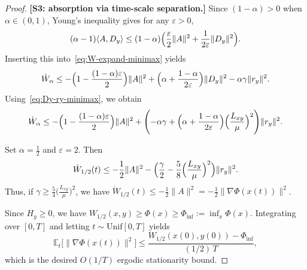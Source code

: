 \documentclass{article}
\newtheorem{proposition}[theorem]{Proposition}
\newcommand{\1}{\mathbf{1}}
\begin{document}
\begin{proof}
\textbf{[S3: absorption via time-scale separation.]}
Since $(1-\alpha)>0$ when $\alpha\in(0,1)$, Young's inequality gives for any $\varepsilon>0$,
\[
(\alpha-1)\langle A,D_y\rangle
\le
(1-\alpha)\Bigl(\frac{\varepsilon}{2}\|A\|^2+\frac{1}{2\varepsilon}\|D_y\|^2\Bigr).
\]
Inserting this into~\eqref{eq:W-expand-minimax} yields
\begin{equation}\label{eq:W-star-minimax}
\dot W_\alpha
\le
-\Bigl(1-\frac{(1-\alpha)\varepsilon}{2}\Bigr)\|A\|^2
+\Bigl(\alpha+\frac{1-\alpha}{2\varepsilon}\Bigr)\|D_y\|^2
-\alpha\gamma\|r_y\|^2.
\end{equation}
Using~\eqref{eq:Dy-ry-minimax}, we obtain
\[
\dot W_\alpha
\le
-\Bigl(1-\frac{(1-\alpha)\varepsilon}{2}\Bigr)\|A\|^2
+\Biggl(-\alpha\gamma+\Bigl(\alpha+\frac{1-\alpha}{2\varepsilon}\Bigr)\Bigl(\frac{L_{xy}}{\mu}\Bigr)^2\Biggr)\|r_y\|^2.
\]

Set $\alpha=\tfrac12$ and $\varepsilon=2$. Then
\[
\dot W_{1/2}(t)
\le
-\frac12\|A\|^2
-\Bigl(\frac{\gamma}{2}-\frac{5}{8}\Bigl(\frac{L_{xy}}{\mu}\Bigr)^2\Bigr)\|r_y\|^2.
\]
Thus, if $\gamma\ge \frac{5}{4}\bigl(\frac{L_{xy}}{\mu}\bigr)^2$, we have $\dot W_{1/2}(t)\le -\frac12\|A\|^2
= -\frac12\|\nabla\Phi(x(t))\|^2$.

Since $H_y\ge 0$, we have $W_{1/2}(x,y)\ge \Phi(x)\ge \Phi_{\inf}:=\inf_x\Phi(x)$.
Integrating over $[0,T]$ and letting $t\sim\mathrm{Unif}[0,T]$ yields
\[
\mathbb E_t\big[\|\nabla\Phi(x(t))\|^2\big]
\le
\frac{W_{1/2}(x(0),y(0))-\Phi_{\inf}}{(1/2)\,T},
\]
which is the desired $O(1/T)$ ergodic stationarity bound.
\end{proof}



\medskip

\end{document}

